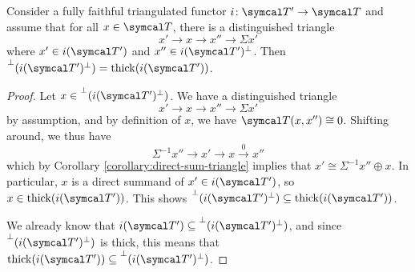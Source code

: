 \begin{lemma}\label{lemma:perp-of-perp-in-presence-of-orthogonal-triangle}
	Consider a fully faithful triangulated functor \( i\!:\calT' \to \calT \) and assume that for all \(x\in\calT\), there is a distinguished triangle
	\[ x' \to x \to x'' \to \Sigma x' \]
	where \(x'\in i(\calT')\) and \(x''\in i(\calT')^\perp\). Then \(\bperp{(i(\calT')^\perp)} = \thick(i(\calT'))\).
\end{lemma}
\begin{proof}
Let \(x\in \bperp{(i(\calT')^\perp)}\). We have a distinguished triangle
\[ x' \to x \to x'' \to \Sigma x' \]
by assumption, and by definition of \(x\), we have \(\calT(x,x'') \cong 0\). Shifting around, we thus have
\[ \Sigma^{-1}x'' \to x' \to x \overset{0}\to x'' \]
which by Corollary \ref{corollary:direct-sum-triangle} implies that \(x' \cong \Sigma^{-1}x'' \oplus x\). In particular, \(x\) is a direct summand of \(x'\in i(\calT')\),
so \(x\in\thick(i(\calT'))\). This shows \(\bperp{(i(\calT')^\perp)} \subseteq\thick(i(\calT'))\).

We already know that \(i(\calT')\subseteq\bperp{(i(\calT')^\perp)}\), and since \(\bperp{(i(\calT')^\perp)}\) is thick, this means that \(\thick(i(\calT'))\subseteq\bperp{(i(\calT')^\perp)}\).
\end{proof}

